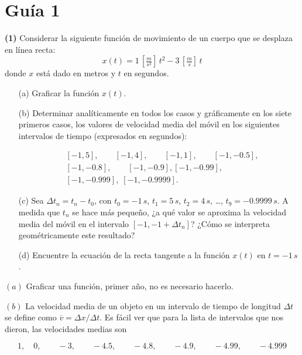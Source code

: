 \documentclass[12pt]{article}
\theoremstyle{definition}
\begin{document}
\section{Guía 1}

\begin{shaded}
    \textbf{(1)} Considerar la siguiente función de movimiento de un cuerpo que se desplaza en línea recta:
\[
x(t) = 1 \, [\tfrac{m}{s^2}] \, t^2 - 3 \, [\tfrac{m}{s}] \, t
\]
donde $x$ está dado en metros y $t$ en segundos.

\begin{itemize}
    \item[(a)] Graficar la función $x(t)$.
    \item[(b)] Determinar analíticamente en todos los casos y gráficamente en los siete primeros casos, los valores de velocidad media del móvil en los siguientes intervalos de tiempo (expresados en segundos): 

\begin{align*}
    &[-1, 5], \qquad [-1, 4], \qquad [-1, 1], \qquad [-1, -0.5], \\ 
    &[-1, -0.8], \qquad [-1, -0.9], [-1, -0.99], \\ 
    &[-1, -0.999], \; [-1, -0.9999].
\end{align*}

    \item[(c)] Sea $\Delta t_n = t_n - t_0$, con $t_0 = -1 \, s$, $t_1 = 5 \, s$, $t_2 = 4 \, s$, \ldots, $t_9 = -0.9999 \, s$. A medida que $t_n$ se hace más pequeño, ¿a qué valor se aproxima la velocidad media del móvil en el intervalo $[-1, -1 + \Delta t_n]$? ¿Cómo se interpreta geométricamente este resultado?
    \item[(d)] Encuentre la ecuación de la recta tangente a la función $x(t)$ en $t = -1 \, s$.
\end{itemize}
\end{shaded}

$(a)$ Graficar una función, primer año, no es necesario hacerlo. 

$(b)$ La velocidad media de un objeto en un intervalo de tiempo de longitud
$\Delta t$ se define como $\overline{v} = \Delta x / \Delta t$. Es fácil ver que
para la lista de intervalos que nos dieron, las velocidades medias son

\begin{equation*}
    1,\quad 0,\qquad -3,\qquad -4.5,\qquad -4.8,\qquad -4.9,\qquad -4.99,\qquad -4.999
\end{equation*}
\end{document}
